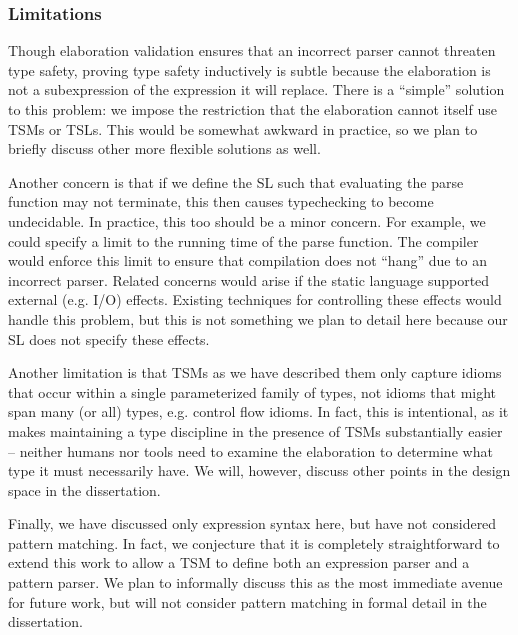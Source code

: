 \subsubsection{Limitations}\label{sec:tsms-limitations}
Though elaboration validation ensures that an incorrect parser cannot threaten type safety,  proving type safety inductively is subtle because the elaboration is not a subexpression of the expression it will replace. There is a ``simple'' solution to this problem: we impose the restriction that the elaboration cannot itself use TSMs or TSLs. This would be somewhat awkward in practice, so we plan to briefly discuss other more flexible solutions as well.  

Another concern is that if we define the SL such that evaluating the parse function may not terminate, this then causes typechecking to become undecidable. In practice, this too should  be a minor concern. For example, we could specify a limit to the running time of the parse function. The compiler would enforce this limit to ensure that compilation does not ``hang'' due to an incorrect parser. Related concerns would arise if the static language supported external (e.g. I/O) effects. Existing techniques for controlling these effects would handle this problem, but this is not something we plan to detail here because our SL does not specify these effects.

Another limitation is that TSMs as we have described them only capture idioms that occur within a single parameterized family of types,  not idioms that might span many (or all) types, e.g. control flow idioms. In fact, this is intentional, as it makes maintaining a type discipline in the presence of TSMs substantially easier -- neither humans nor tools need to examine the elaboration to determine what type it must necessarily have. We will, however, discuss other points in the design space in the dissertation.

Finally, we have discussed only expression syntax here, but have not considered pattern matching. In fact, we conjecture that it is completely straightforward to extend this work to allow a TSM to define both an expression parser and a pattern parser. We plan to informally discuss this as the most immediate avenue for future work, but will not consider pattern matching in formal detail in the dissertation.

